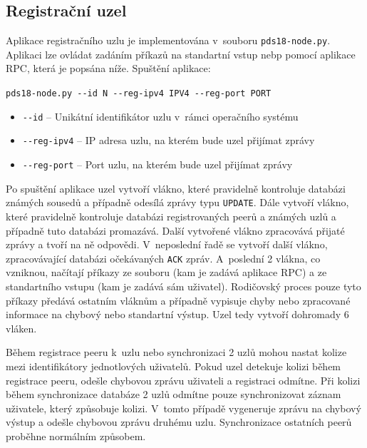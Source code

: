 \documentclass[11pt,a4paper,titlepage]{article}
\begin{document}
        \subsection{Registrační uzel}
            Aplikace registračního uzlu je implementována v~souboru \texttt{pds18-node.py}. Aplikaci lze ovládat zadáním příkazů na
            standartní vstup nebp pomocí aplikace RPC, která je popsána níže. Spuštění aplikace:


            \fontsize{11pt}{12pt}\verb+pds18-node.py --id N --reg-ipv4 IPV4 --reg-port PORT+
            \begin{itemize}
                \item \verb+--id+ -- Unikátní identifikátor uzlu v~rámci operačního systému
                \item \verb+--reg-ipv4+ -- IP adresa uzlu, na kterém bude uzel přijímat zprávy
                \item \verb+--reg-port+ -- Port uzlu, na kterém bude uzel přijímat zprávy
            \end{itemize}

            Po spuštění aplikace uzel vytvoří vlákno, které pravidelně kontroluje databázi známých sousedů a případně odesílá
            zprávy typu \texttt{UPDATE}. Dále vytvoří vlákno, které pravidelně kontroluje databázi registrovaných peerů a
            známých uzlů a případně tuto databázi promazává. Další vytvořené vlákno zpracovává přijaté zprávy a tvoří na ně
            odpovědi. V~neposlední řadě se vytvoří další vlákno, zpracovávající databázi očekávaných \texttt{ACK} zpráv.
            A~poslední 2 vlákna, co vzniknou, načítají příkazy ze souboru (kam je zadává aplikace RPC) a ze standartního
            vstupu (kam je zadává sám uživatel). Rodičovský proces pouze tyto příkazy předává ostatním vláknům a případně vypisuje
            chyby nebo zpracované informace na chybový nebo standartní výstup. Uzel tedy vytvoří dohromady 6 vláken.

            Během registrace peeru k~uzlu nebo synchronizaci 2 uzlů mohou nastat kolize mezi identifikátory jednotlových
            uživatelů. Pokud uzel detekuje kolizi během registrace peeru, odešle chybovou zprávu uživateli a registraci
            odmítne. Při kolizi během synchronizace databáze 2 uzlů odmítne pouze synchronizovat záznam uživatele, který
            způsobuje kolizi. V~tomto případě vygeneruje zprávu na chybový výstup a odešle chybovou zprávu druhému uzlu.
            Synchronizace ostatních peerů proběhne normálním způsobem.
\end{document}
